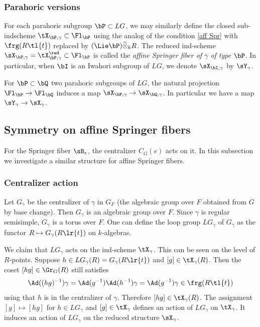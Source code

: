 \subsubsection{Parahoric versions} For each parahoric subgroup $\bP\subset LG$, we may similarly define the closed sub-indscheme $\tX_{\bP,\gamma}\subset\Fl_{\bP}$ using the analog of the condition \eqref{aff Spr} with $\frg(R\tl{t})$ replaced by $(\Lie\bP)\widehat{\otimes}_{k}R$. The reduced ind-scheme $\sX_{\bP,\gamma}=\tX_{\bP,\gamma}^{\red}\subset\Fl_{\bP}$ is called the {\em affine Springer fiber of $\gamma$ of type $\bP$}. In particular, when $\bI$ is an Iwahori subgroup of $LG$, we denote $\sX_{\bI,\gamma}$ by $\sY_{\gamma}$.

For $\bP\subset\bQ$ two parahoric subgroups of $LG$, the natural projection $\Fl_{\bP}\to \Fl_{\bQ}$ induces a map $\sX_{\bP,\gamma}\to \sX_{\bQ,\gamma}$. In particular we have a map $\sY_{\gamma}\to \sX_{\gamma}$.





\subsection{Symmetry on affine Springer fibers}
For the Springer fiber $\sB_{e}$, the centralizer $C_{G}(e)$ acts on it. In this subsection we investigate a similar structure for affine Springer fibers. 

\subsubsection{Centralizer action}\label{sss:centralizer} Let $G_{\gamma}$ be the centralizer of $\gamma$ in $G_{F}$ (the algebraic group over $F$ obtained from $G$ by base change). Then $G_{\gamma}$ is an algebraic group over $F$. Since $\gamma$ is regular semisimple, $G_{\gamma}$ is a torus over $F$. One can define the loop group $LG_{\gamma}$ of $G_{\gamma}$ as the functor $R\mapsto G_{\gamma}(R\lr{t})$ on $k$-algebras.

We claim that $LG_{\gamma}$ acts on the ind-scheme $\tX_{\gamma}$. This can be seen on the level of $R$-points. Suppose $h\in LG_{\gamma}(R)=G_{\gamma}(R\lr{t})$ and $[g]\in \tX_{\gamma}(R)$. Then the coset $[hg]\in \Gr_{G}(R)$ still satisfies
\begin{equation*}
\Ad((hg)^{-1})\gamma=\Ad(g^{-1})\Ad(h^{-1})\gamma=\Ad(g^{-1})\gamma\in\frg(R\tl{t})
\end{equation*}
using that $h$ is in the centralizer of $\gamma$. Therefore $[hg]\in \tX_{\gamma}(R)$. The assignment $[g]\mapsto [hg]$ for $h\in LG_{\gamma}$ and $[g]\in\tX_{\gamma}$ defines an action of   $LG_{\gamma}$ on $\tX_{\gamma}$. It induces an action of $LG_{\gamma}$ on the reduced structure $\sX_{\gamma}$.


